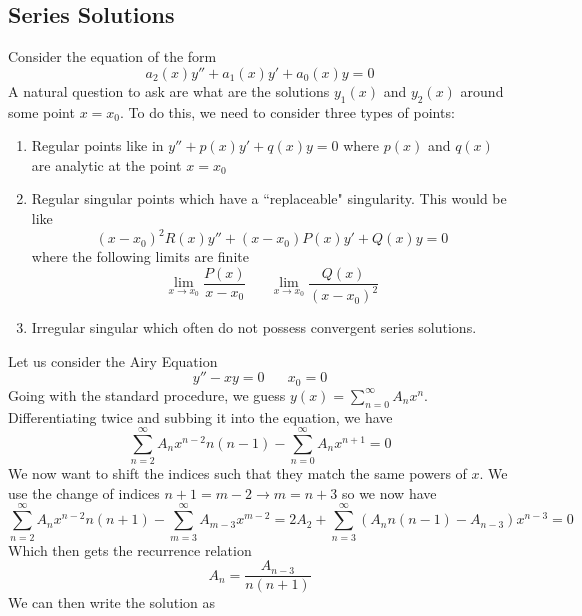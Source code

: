 \documentclass{article}
\newcommand{\twen}{\hspace{20pt}}
\begin{document}
\subsection{Series Solutions}
Consider the equation of the form 
\begin{equation*}
    a_2(x)y''+a_1(x)y'+a_0(x)y=0
\end{equation*}
A natural question to ask are what are the solutions $y_1(x)$ and $y_2(x)$ around some point $x=x_0$. To do this, we need to consider three types of points:
\begin{enumerate}
    \item Regular points like in $y''+p(x)y'+q(x)y=0$ where $p(x)$ and $q(x)$ are analytic at the point $x=x_0$
    \item Regular singular points which have a ``replaceable" singularity. This would be like 
    \begin{equation*}
        (x-x_0)^2R(x)y''+(x-x_0)P(x)y'+Q(x)y=0
    \end{equation*}
    where the following limits are finite 
    \begin{equation*}
        \lim_{x\rightarrow x_0}\frac{P(x)}{x-x_0} \twen \lim_{x\rightarrow x_0} \frac{Q(x)}{(x-x_0)^2}
    \end{equation*}
    \item Irregular singular which often do not possess convergent series solutions.
\end{enumerate}
Let us consider the Airy Equation 
\begin{equation*}
    y''-xy=0 \twen x_0=0
\end{equation*}
Going with the standard procedure, we guess $y(x)=\displaystyle{\sum^\infty_{n=0}}A_nx^n$. Differentiating twice and subbing it into the equation, we have 
\begin{equation*}
    \sum^\infty_{n=2}A_nx^{n-2}n(n-1) - \sum^\infty_{n=0}A_nx^{n+1}=0
\end{equation*}
We now want to shift the indices such that they match the same powers of $x$. We use the change of indices $n+1=m-2 \rightarrow m=n+3$ so we now have 
\begin{equation*}
    \sum^\infty_{n=2}A_nx^{n-2}n(n+1) -\sum^\infty_{m=3}A_{m-3}x^{m-2} =2A_2+\sum^\infty_{n=3}(A_nn(n-1)-A_{n-3})x^{n-3}=0
\end{equation*}
Which then gets the recurrence relation 
\begin{equation*}
    A_n=\frac{A_{n-3}}{n(n+1)}
\end{equation*}
We can then write the solution as 
\end{document}
